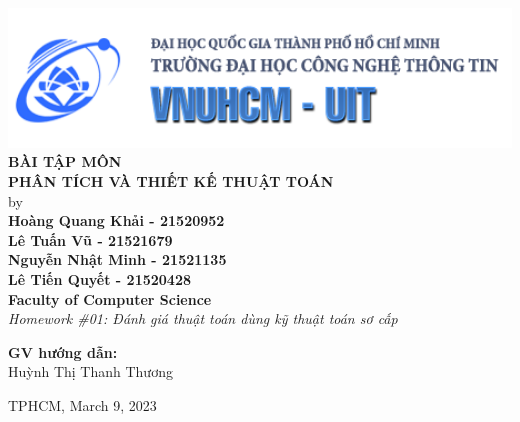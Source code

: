 \documentclass[12pt, a4paper]{article}
\begin{document}

\begin{titlepage}

\begin{center}

\includegraphics[width=1\textwidth]{img/banner_uit.png}\\%
\vspace{3em}%
\Large \textbf {BÀI TẬP MÔN\\PHÂN TÍCH VÀ
THIẾT KẾ THUẬT TOÁN}\\%
\vspace{1em}%
\normalsize by \\%
\vspace{1em}
\textup{\small {\bf Hoàng Quang Khải - 21520952}\\
{\bf Lê Tuấn Vũ - 21521679}\\
{\bf Nguyễn Nhật Minh - 21521135}\\
{\bf Lê Tiến Quyết - 21520428}\\}
 \vspace{1em}%
{\bf Faculty of Computer Science}\\[0.5in]

\emph{Homework \#01: Đánh giá thuật toán dùng kỹ thuật toán sơ cấp}

\vspace{1in}

    
\normalsize {\bf GV hướng dẫn:} \\

Huỳnh Thị Thanh Thương\\
\vspace{1em}

\vfill


TPHCM, March 9, 2023

\end{center}

\end{titlepage}
\end{document}
